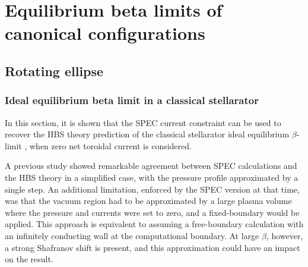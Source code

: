 \documentclass[my_thesis.tex]{subfiles}
\begin{document}
\chapter{Equilibrium beta limits of canonical configurations}

\section{Rotating ellipse}

\subsection{Ideal equilibrium beta limit in a classical stellarator} \label{sec.idealbetalimit}

In this section, it is shown that the \ac{SPEC} current constraint can be used to recover the \ac{HBS} theory prediction of the classical stellarator ideal equilibrium $\beta$-limit \citep{Freidberg2014,wakatani_stellarator_1998}, when zero net toroidal current is considered.  

A previous study \citep{Loizu2017} showed remarkable agreement between \ac{SPEC} calculations and the \ac{HBS} theory in a simplified case, with the pressure profile approximated by a single step. An additional limitation, enforced by the \ac{SPEC} version at that time, was that the vacuum region had to be approximated by a large plasma volume where the pressure and currents were set to zero, and a fixed-boundary would be applied. This approach is equivalent to assuming a free-boundary calculation with an infinitely conducting wall at the computational boundary. At large $\beta$, however, a strong Shafranov shift is present, and this approximation could have an impact on the result.
\end{document}

